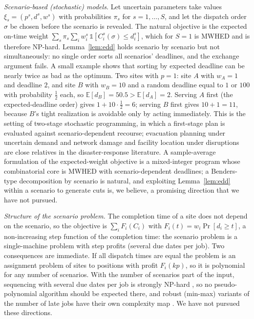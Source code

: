 \documentclass[pdflatex,sn-mathphys-ay]{sn-jnl}
\theoremstyle{thmstyleone}
\theoremstyle{thmstyletwo}
\theoremstyle{thmstylethree}
\begin{document}
\emph{Scenario-based (stochastic) models.} Let uncertain parameters
take values $\xi_s=(p^s,d^s,w^s)$ with probabilities $\pi_s$ for
$s=1,\dots,S$, and let the dispatch order $\sigma$ be chosen before the
scenario is revealed. The natural objective is the expected on-time
weight $\sum_s\pi_s\sum_iw_i^s\,\mathbb 1[C_i^s(\sigma)\le d_i^s]$,
which for $S=1$ is MWHED and is therefore NP-hard. Lemma~\ref{lem:edd}
holds scenario by scenario but not simultaneously: no single order sorts
all scenarios' deadlines, and the exchange argument fails. A small
example shows that sorting by expected deadline can be nearly twice as
bad as the optimum. Two sites with $p=1$: site $A$ with $w_A=1$ and
deadline $2$, and site $B$ with $w_B=10$ and a random deadline equal to
$1$ or $100$ with probability $\tfrac12$ each, so $\mathbb E[d_B]=50.5>
\mathbb E[d_A]=2$. Serving $A$ first (the expected-deadline order) gives
$1+10\cdot\tfrac12=6$; serving $B$ first gives $10+1=11$, because $B$'s
tight realization is avoidable only by acting immediately. This is the
setting of two-stage stochastic programming, in which a first-stage plan
is evaluated against scenario-dependent recourse; evacuation planning
under uncertain demand and network damage
\citep{wang2020evac} and facility location under disruptions
\citep{koca2023} are close relatives in the disaster-response
literature. A sample-average formulation of the expected-weight
objective is a mixed-integer program whose combinatorial core is
MWHED with scenario-dependent deadlines; a Benders-type decomposition by
scenario is natural, and exploiting Lemma~\ref{lem:edd} within a scenario
to generate cuts is, we believe, a promising direction that we have not
pursued.

\emph{Structure of the scenario problem.} The completion time of a site
does not depend on the scenario, so the objective is $\sum_iF_i(C_i)$ with
$F_i(t)=w_i\Pr[d_i\ge t]$, a non-increasing step function of the
completion time: the scenario problem is a single-machine problem with
step profits (several due dates per job). Two consequences are immediate.
If all dispatch times are equal the problem is an assignment problem of
sites to positions with profit $F_i(kp)$, so it is polynomial for any
number of scenarios. With the number of scenarios part of the input,
sequencing with several due dates per job is strongly NP-hard
\citep{kuhn2024}, so no pseudo-polynomial algorithm should be expected
there, and robust (min-max) variants of the number of late jobs have their
own complexity map \citep{aissi2011}. We have not pursued these
directions.
\end{document}
